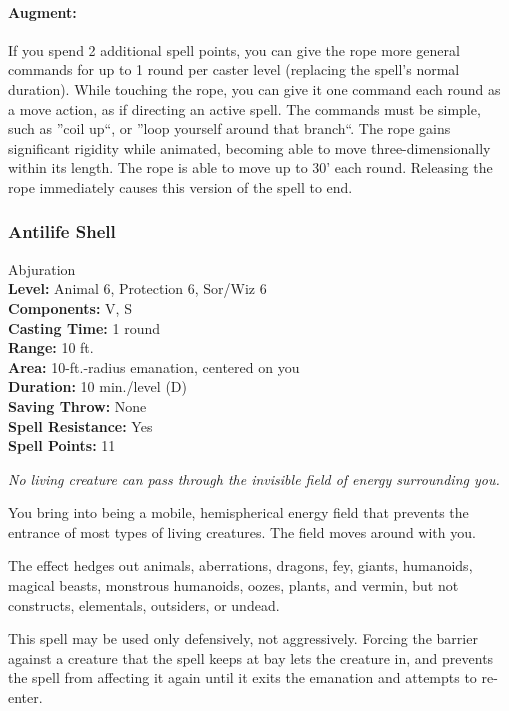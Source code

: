 \paragraph{Augment:} If you spend 2 additional spell points, you can give the rope more general commands for up to 1 round per caster level (replacing the spell's normal duration). While touching the rope, you can give it one command each round as a move action, as if directing an active spell. The commands must be simple, such as ''coil up``, or ''loop yourself around that branch``. The rope gains significant rigidity while animated, becoming able to move three-dimensionally within its length. The rope is able to move up to 30' each round. Releasing the rope immediately causes this version of the spell to end. 

\subsubsection{Antilife Shell}
\label{Spell:AntilifeShell}
Abjuration
\\ \textbf{Level:} Animal 6, Protection 6, Sor/Wiz 6
\\ \textbf{Components:} V, S
\\ \textbf{Casting Time:} 1 round
\\ \textbf{Range:} 10 ft.
\\ \textbf{Area:} 10-ft.-radius emanation, centered on you
\\ \textbf{Duration:} 10 min./level (D)
\\ \textbf{Saving Throw:} None
\\ \textbf{Spell Resistance:} Yes
\\ \textbf{Spell Points:} 11

\emph{No living creature can pass through the invisible field of energy surrounding you.}

You bring into being a mobile, hemispherical energy field that prevents the entrance of most types of living creatures.
The field moves around with you.

The effect hedges out animals, aberrations, dragons, fey, giants, humanoids, magical beasts, monstrous humanoids, oozes, plants, and vermin, but not constructs, elementals, outsiders, or undead.

This spell may be used only defensively, not aggressively. Forcing the barrier against a creature that the spell keeps at bay lets the creature in, and prevents the spell from affecting it again until it exits the emanation and attempts to re-enter.

